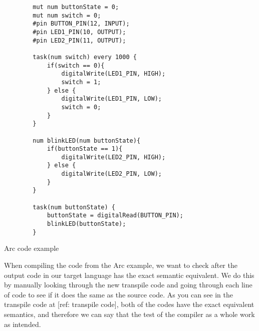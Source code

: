 

\begin{listing}[htb!]
    \begin{verbatim}
        mut num buttonState = 0;
        mut num switch = 0;
        #pin BUTTON_PIN(12, INPUT);
        #pin LED1_PIN(10, OUTPUT);
        #pin LED2_PIN(11, OUTPUT);

        task(num switch) every 1000 {
            if(switch == 0){
                digitalWrite(LED1_PIN, HIGH);
                switch = 1;
            } else {
                digitalWrite(LED1_PIN, LOW);
                switch = 0;
            }
        }

        num blinkLED(num buttonState){
            if(buttonState == 1){
                digitalWrite(LED2_PIN, HIGH);
            } else {
                digitalWrite(LED2_PIN, LOW);
            }
        }

        task(num buttonState) {
            buttonState = digitalRead(BUTTON_PIN);
            blinkLED(buttonState);
        }
    \end{verbatim}
    \caption{Arc code example}
    \label{lst:arc code example}
\end{listing}

When compiling the code from the Arc example, we want to check after the output code in our target language has the exact semantic equivalent. We do this by manually looking through the new transpile code and going through each line of code to see if it does the same as the source code. As you can see in the transpile code at [ref: transpile code], both of the codes have the exact equivalent semantics, and therefore we can say that the test of the compiler as a whole work as intended.

